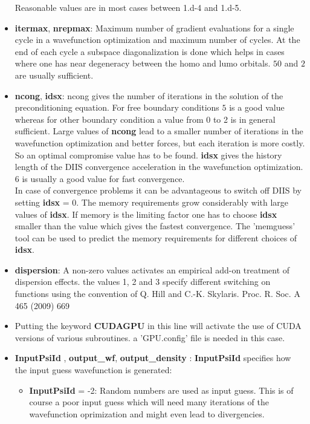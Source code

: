 \documentclass[a4paper,11pt]{report}
\begin{document}
\begin{itemize}
      Reasonable values are in most cases between 1.d-4 and 1.d-5.
\item {\bf itermax}, {\bf nrepmax}: Maximum number of gradient evaluations for a single cycle in a wavefunction optimization 
      and maximum number of cycles. At the end of each cycle a subspace diagonalization is done which helps 
in cases where one has near degeneracy between the homo and lumo orbitals. $50$ and $2$ are usually sufficient.
\item {\bf ncong}, {\bf idsx}: ncong gives the number of iterations in the solution of the preconditioning equation.
      For free boundary conditions $5$ is a good value whereas for other  boundary condition a value from 0 to 2 is in general sufficient. 
      Large values of {\bf ncong} lead to a smaller number of iterations in 
      the wavefunction optimization and better forces, but each iteration is more costly. So an optimal compromise value has to be found.
      {\bf idsx} gives the history length of the DIIS convergence acceleration in the wavefunction optimization.
      6 is usually a good value for fast convergence.\\
      In case of convergence problems it can be advantageous 
      to switch off DIIS by setting {\bf idsx} = 0. The memory requirements grow considerably with large values of 
      {\bf idsx}. If memory is the limiting factor one has to choose {\bf idsx} smaller than the value which gives 
      the fastest convergence. The 'memguess' tool can be used to predict the memory requirements for different choices 
      of  {\bf idsx}.
\item {\bf dispersion}:  A non-zero values activates an  empirical add-on treatment of dispersion effects.
       the values 1, 2 and 3 specify different switching on functions using the convention of 
       Q. Hill and C.-K. Skylaris.  Proc. R. Soc. A 465  (2009) 669
\item  Putting the keyword \textbf{CUDAGPU} in this line will activate the use of CUDA versions of various subroutines.
       a 'GPU.config' file is needed in this case. 
\item {\bf InputPsiId }, {\bf  output\_wf},  {\bf output\_density }: 
       {\bf InputPsiId } specifies how the input guess wavefunction is generated:
      \begin{itemize}
       \item {\bf InputPsiId } = -2: Random numbers are used as input guess. This is of course a poor input guess which will 
                                    need many iterations of the wavefunction oprimization and might even lead to divergencies.

\end{itemize}
\end{itemize}
\end{document}
